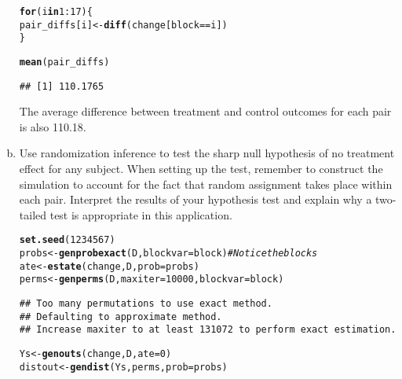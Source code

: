 \documentclass[11pt,notitlepage]{article}\usepackage[]{graphicx}\usepackage[]{color}
\makeatletter
\newcommand{\hlnum}[1]{\textcolor[rgb]{0.686,0.059,0.569}{#1}}%
\newcommand{\hlcom}[1]{\textcolor[rgb]{0.678,0.584,0.686}{\textit{#1}}}%
\newcommand{\hlopt}[1]{\textcolor[rgb]{0,0,0}{#1}}%
\newcommand{\hlstd}[1]{\textcolor[rgb]{0.345,0.345,0.345}{#1}}%
\newcommand{\hlkwa}[1]{\textcolor[rgb]{0.161,0.373,0.58}{\textbf{#1}}}%
\newcommand{\hlkwb}[1]{\textcolor[rgb]{0.69,0.353,0.396}{#1}}%
\newcommand{\hlkwc}[1]{\textcolor[rgb]{0.333,0.667,0.333}{#1}}%
\newcommand{\hlkwd}[1]{\textcolor[rgb]{0.737,0.353,0.396}{\textbf{#1}}}%
\newenvironment{kframe}{%
 \def\at@end@of@kframe{}%
 \ifinner\ifhmode%
  \def\at@end@of@kframe{\end{minipage}}%
  \begin{minipage}{\columnwidth}%
 \fi\fi%
 \def\FrameCommand##1{\hskip\@totalleftmargin \hskip-\fboxsep
 \colorbox{shadecolor}{##1}\hskip-\fboxsep
     \hskip-\linewidth \hskip-\@totalleftmargin \hskip\columnwidth}%
 \MakeFramed {\advance\hsize-\width
   \@totalleftmargin\z@ \linewidth\hsize
   \@setminipage}}%
 {\par\unskip\endMakeFramed%
 \at@end@of@kframe}
\newenvironment{knitrout}{}{} %
\makeatother
\begin{document}
\begin{enumerate}[a)]
\begin{knitrout}
\begin{kframe}
\begin{alltt}
\hlkwa{for} \hlstd{(i} \hlkwa{in} \hlnum{1}\hlopt{:}\hlnum{17}\hlstd{)\{}
\hlstd{pair_diffs[i]} \hlkwb{<-} \hlkwd{diff}\hlstd{(change[block}\hlopt{==}\hlstd{i])}
\hlstd{\}}

\hlkwd{mean}\hlstd{(pair_diffs)}
\end{alltt}
\begin{verbatim}
## [1] 110.1765
\end{verbatim}
\end{kframe}
\end{knitrout}
The average difference between treatment and control outcomes for each pair is also 110.18.

\item Use randomization inference to test the sharp null hypothesis of no treatment effect for any subject.  When setting up the test, remember to construct the simulation to account for the fact that random assignment takes place within each pair.  Interpret the results of your hypothesis test and explain why a two-tailed test is appropriate in this application.
\begin{knitrout}
\color{fgcolor}\begin{kframe}
\begin{alltt}
\hlkwd{set.seed}\hlstd{(}\hlnum{1234567}\hlstd{)}
\hlstd{probs} \hlkwb{<-} \hlkwd{genprobexact}\hlstd{(D,}\hlkwc{blockvar}\hlstd{=block)} \hlcom{# Notice the blocks}
\hlstd{ate} \hlkwb{<-} \hlkwd{estate}\hlstd{(change,D,}\hlkwc{prob}\hlstd{=probs)}
\hlstd{perms} \hlkwb{<-} \hlkwd{genperms}\hlstd{(D,}\hlkwc{maxiter}\hlstd{=}\hlnum{10000}\hlstd{,}\hlkwc{blockvar}\hlstd{=block)}
\end{alltt}
\begin{verbatim}
## Too many permutations to use exact method.
## Defaulting to approximate method.
## Increase maxiter to at least 131072 to perform exact estimation.
\end{verbatim}
\begin{alltt}
\hlstd{Ys} \hlkwb{<-} \hlkwd{genouts}\hlstd{(change,D,}\hlkwc{ate}\hlstd{=}\hlnum{0}\hlstd{)}
\hlstd{distout} \hlkwb{<-} \hlkwd{gendist}\hlstd{(Ys,perms,}\hlkwc{prob}\hlstd{=probs)}


\end{alltt}
\end{kframe}
\end{knitrout}
\end{enumerate}
\end{document}
